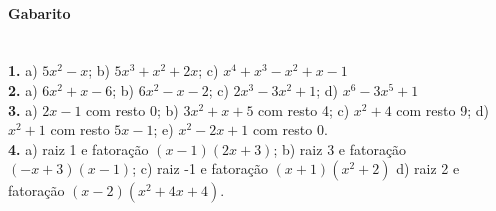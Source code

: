 \documentclass[a4paper,12pt]{article}
\begin{document}
\begin{multicols}{2}
\vspace*{5cm}
\end{multicols}
 
\vspace*{\fill}
{\footnotesize
\paragraph*{Gabarito} \hspace*{\fill}\\
\textbf{1.} a) $5x^2 - x$; b) $5x^3 + x^2 + 2x$; c) $x^4 + x^3 - x^2 + x - 1$\\
\textbf{2.} a) $6x^2 + x - 6$; b) $6x^2 - x - 2$; c) $2x^3 - 3x^2 + 1$; d) $x^6 - 3x^5 + 1$ \\
\textbf{3.} a) $2x - 1$ com resto 0; b) $3x^2 + x + 5$ com resto 4; c) $x^2 + 4$ com resto 9; d) $x^2  + 1$ com resto $5x-1$; e) $x^2-2x+1$ com resto 0.\\
\textbf{4.} a) raiz 1 e fatoração $(x-1)(2x+3)$; b) raiz 3 e fatoração $(-x+3)(x-1)$; c) raiz -1 e fatoração $(x+1)(x^2+2)$ d) raiz 2 e fatoração $(x-2)(x^2+4x+4)$.
}
\end{document}
